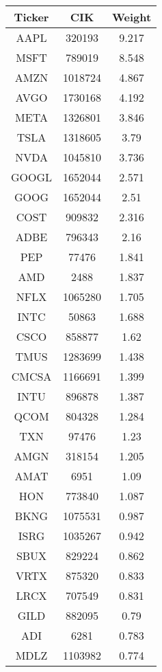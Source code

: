 \documentclass[logo,bsc,singlespacing,parskip]{infthesis}
\begin{document}
\begin{longtable}
            \footnotesize
                \begin{tabular}[t]{|c|c|c|}
                    \hline
                    \textbf{Ticker} & \textbf{CIK} & \textbf{Weight} \\ \hline
AAPL & 320193 & 9.217 \\ \hline
MSFT & 789019 & 8.548 \\ \hline
AMZN & 1018724 & 4.867 \\ \hline
AVGO & 1730168 & 4.192 \\ \hline
META & 1326801 & 3.846 \\ \hline
TSLA & 1318605 & 3.79 \\ \hline
NVDA & 1045810 & 3.736 \\ \hline
GOOGL & 1652044 & 2.571 \\ \hline
GOOG & 1652044 & 2.51 \\ \hline
COST & 909832 & 2.316 \\ \hline
ADBE & 796343 & 2.16 \\ \hline
PEP & 77476 & 1.841 \\ \hline
AMD & 2488 & 1.837 \\ \hline
NFLX & 1065280 & 1.705 \\ \hline
INTC & 50863 & 1.688 \\ \hline
CSCO & 858877 & 1.62 \\ \hline
TMUS & 1283699 & 1.438 \\ \hline
CMCSA & 1166691 & 1.399 \\ \hline
INTU & 896878 & 1.387 \\ \hline
QCOM & 804328 & 1.284 \\ \hline
TXN & 97476 & 1.23 \\ \hline
AMGN & 318154 & 1.205 \\ \hline
AMAT & 6951 & 1.09 \\ \hline
HON & 773840 & 1.087 \\ \hline
BKNG & 1075531 & 0.987 \\ \hline
ISRG & 1035267 & 0.942 \\ \hline
SBUX & 829224 & 0.862 \\ \hline
VRTX & 875320 & 0.833 \\ \hline
LRCX & 707549 & 0.831 \\ \hline
GILD & 882095 & 0.79 \\ \hline
ADI & 6281 & 0.783 \\ \hline
MDLZ & 1103982 & 0.774 \\ \hline

\end{tabular}
\end{longtable}
\end{document}

